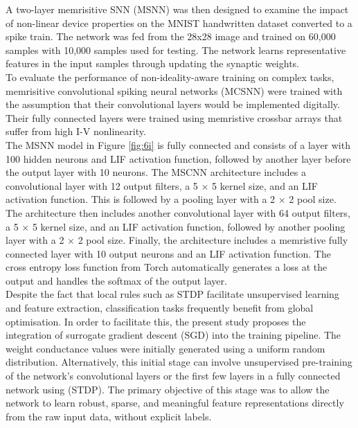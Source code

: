\noindent A two-layer memrisitive SNN (MSNN) was then designed to examine the impact of non-linear device properties on the MNIST handwritten dataset converted to a spike train.  The network was fed from the 28x28 image and trained on 60,000 samples with 10,000 samples used for testing. The network learns representative features in the input samples through updating the synaptic weights. \\


\noindent To evaluate the performance of non-ideality-aware training on complex tasks, memrisitive convolutional spiking neural networks (MCSNN) were trained with the assumption that their convolutional layers would be implemented digitally. Their fully connected layers were trained using memristive crossbar arrays that suffer from high I-V nonlinearity. \\

\noindent The MSNN model in Figure \ref{fig:6i} is fully connected and consists of a layer with 100 hidden neurons and LIF activation function, followed by another layer before the output layer with 10 neurons. The MSCNN architecture includes a convolutional layer with 12 output filters, a 5 × 5 kernel size, and an LIF activation function. This is followed by a pooling layer with a 2 × 2 pool size. \\

\noindent The architecture then includes another convolutional layer with 64 output filters, a 5 × 5 kernel size, and an LIF activation function, followed by another pooling layer with a 2 × 2 pool size. Finally, the architecture includes a memristive fully connected layer with 10 output neurons and an LIF activation function. The cross entropy loss function from Torch \cite{eshraghian2023training} automatically generates a loss at the output and handles the softmax of the output layer. \\

\noindent Despite the fact that local rules such as STDP facilitate unsupervised learning and feature extraction, classification tasks frequently benefit from global optimisation. In order to facilitate this, the present study proposes the integration of surrogate gradient descent (SGD) into the training pipeline. The weight conductance values were initially generated using a uniform random distribution. Alternatively, this initial stage can involve unsupervised pre-training of the network's convolutional layers or the first few layers in a fully connected network using (STDP). The primary objective of this stage was to allow the network to learn robust, sparse, and meaningful feature representations directly from the raw input data, without explicit labels.\\

